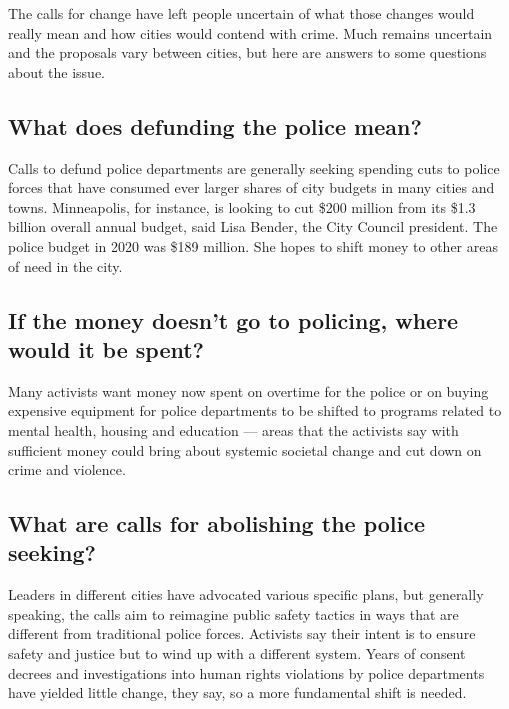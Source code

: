 The calls for change have left people uncertain of what those changes
would really mean and how cities would contend with crime. Much remains
uncertain and the proposals vary between cities, but here are answers to
some questions about the issue.

\hypertarget{what-does-defunding-the-police-mean}{%
\subsection{What does defunding the police
mean?}\label{what-does-defunding-the-police-mean}}

Calls to defund police departments are generally seeking spending cuts
to police forces that have consumed ever larger shares of city budgets
in many cities and towns. Minneapolis, for instance, is looking to cut
\$200 million from its \$1.3 billion overall annual budget, said Lisa
Bender, the City Council president. The police budget in 2020 was \$189
million. She hopes to shift money to other areas of need in the city.

\hypertarget{if-the-money-doesnt-go-to-policing-where-would-it-be-spent}{%
\subsection{If the money doesn't go to policing, where would it be
spent?}\label{if-the-money-doesnt-go-to-policing-where-would-it-be-spent}}

Many activists want money now spent on overtime for the police or on
buying expensive equipment for police departments to be shifted to
programs related to mental health, housing and education --- areas that
the activists say with sufficient money could bring about systemic
societal change and cut down on crime and violence.

\hypertarget{what-are-calls-for-abolishing-the-police-seeking}{%
\subsection{What are calls for abolishing the police
seeking?}\label{what-are-calls-for-abolishing-the-police-seeking}}

Leaders in different cities have advocated various specific plans, but
generally speaking, the calls aim to reimagine public safety tactics in
ways that are different from traditional police forces. Activists say
their intent is to ensure safety and justice but to wind up with a
different system. Years of consent decrees and investigations into human
rights violations by police departments have yielded little change, they
say, so a more fundamental shift is needed.

